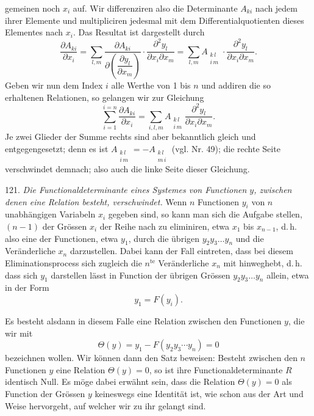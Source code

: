 \documentclass[11pt]{article}
\providecommand{\weberpage}[1]{}
\providecommand{\weq}[2]{\begin{equation}\tag{#1}#2\end{equation}}
\let\Theta\varTheta
\begin{document}
gemeinen noch $x_i$ auf. Wir differenziren also die Determinante $A_{ki}$ nach jedem ihrer Elemente und multipliciren jedesmal mit dem Differentialquotienten dieses Elementes nach $x_i$. Das Resultat ist dargestellt durch
\[
\frac{\partial A_{ki}}{\partial x_i} = \sum_{l,m} \frac{\partial A_{ki}}{\partial\left(\dfrac{\partial y_l}{\partial x_m}\right)} \cdot \frac{\partial^2 y_l}{\partial x_i \partial x_m} = \sum_{l,m} A_{\substack{k\,l\\ i\,m}} \cdot \frac{\partial^2 y_l}{\partial x_i \partial x_m}.
\]
Geben wir nun dem Index $i$ alle Werthe von 1 bis $n$ und addiren die so erhaltenen Relationen, so gelangen wir zur Gleichung
\[
\sum_{i=1}^{i=n} \frac{\partial A_{ki}}{\partial x_i} = \sum_{i,l,m} A_{\substack{k\,l\\ i\,m}} \frac{\partial^2 y_l}{\partial x_i \partial x_m}.
\]
Je zwei Glieder der Summe rechts sind aber bekanntlich gleich und entgegengesetzt; denn es ist $A_{\substack{k\,l\\ i\,m}} = -A_{\substack{k\,l\\ m\,i}}$ (vgl. Nr. 49); die rechte Seite verschwindet demnach; also auch die linke Seite dieser Gleichung.

121. \textit{Die Functionaldeterminante eines Systemes von Functionen $y$, zwischen denen eine Relation besteht, verschwindet.} Wenn $n$ Functionen $y_i$ von $n$ unabhängigen Variabeln $x_i$ gegeben sind, so kann man sich die Aufgabe stellen, $(n-1)$ der Grössen $x_i$ der Reihe nach zu eliminiren, etwa $x_1$ bis $x_{n-1}$, d.\,h. also eine der Functionen, etwa $y_1$, durch die übrigen $y_2 y_3 \ldots y_n$ und die Veränderliche $x_n$ darzustellen. Dabei kann der Fall eintreten, dass bei diesem Eliminationsprocess sich zugleich die $n^{\mathrm{te}}$ Veränderliche $x_n$ mit hinweghebt, d.\,h. dass sich $y_1$ darstellen lässt in Function der übrigen Grössen $y_2 y_3 \ldots y_n$ allein, etwa in der Form
\weq{1}{y_1 = F(y_i).}


\weberpage{129}

Es besteht alsdann in diesem Falle eine Relation zwischen den Functionen $y$, die wir mit
\weq{2}{\Theta(y) = y_1 - F(y_2 y_3 \cdots y_n) = 0}
bezeichnen wollen. Wir können dann den Satz beweisen: \glqq Besteht zwischen den $n$ Functionen $y$ eine Relation $\Theta(y) = 0$, so ist ihre Functionaldeterminante $R$ identisch Null.\grqq{} Es möge dabei erwähnt sein, dass die Relation $\Theta(y) = 0$ als Function der Grössen $y$ keineswegs eine Identität ist, wie schon aus der Art und Weise hervorgeht, auf welcher wir zu ihr gelangt sind.
\end{document}
